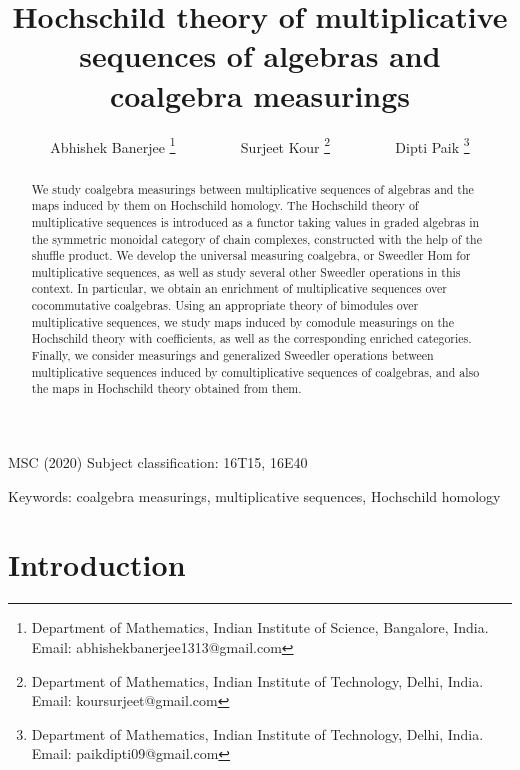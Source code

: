 \documentclass[10pt, colorlinks]{article}
\title{Hochschild theory of multiplicative sequences of algebras and coalgebra measurings}
\author{Abhishek Banerjee \footnote{Department of Mathematics, Indian Institute of Science, Bangalore, India. Email: abhishekbanerjee1313@gmail.com} $\qquad\qquad$ Surjeet Kour \footnote{Department of Mathematics, Indian Institute of Technology, Delhi, India. Email: koursurjeet@gmail.com} 
 $\qquad\qquad$ Dipti Paik \footnote{Department of Mathematics, Indian Institute of Technology, Delhi, India. Email: paikdipti09@gmail.com} }
\date{}
\numberwithin{equation}{section} \DeclareMathSizes{2}{10}{12}{13}
\begin{document}

\maketitle 

\medskip



\begin{abstract}
We study coalgebra measurings between multiplicative sequences of algebras and the maps induced by them on Hochschild homology. The Hochschild theory of multiplicative sequences is introduced as a functor taking values in graded algebras in the symmetric monoidal category of chain complexes, constructed with the help of the shuffle product. We develop the universal measuring coalgebra, or Sweedler Hom for multiplicative sequences, as well as study several other Sweedler operations in this context. In particular, we obtain an enrichment of multiplicative sequences over cocommutative coalgebras. Using an appropriate theory of bimodules over multiplicative sequences, we  study maps induced by comodule measurings  on the Hochschild theory with coefficients, as well as the corresponding enriched categories. Finally, we consider measurings and generalized Sweedler operations between multiplicative sequences induced by comultiplicative sequences of coalgebras, and also the maps in Hochschild theory obtained from them. 
\end{abstract}

\medskip

{MSC (2020) Subject classification: 16T15, 16E40} 



\medskip
{Keywords: coalgebra measurings, multiplicative sequences, Hochschild homology}

	
	
	\hypersetup{linktocpage}
	\section{Introduction}
\end{document}
